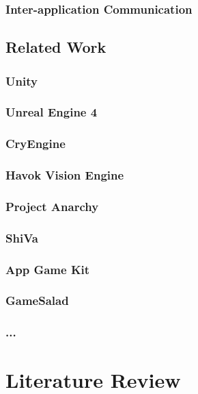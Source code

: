 \documentclass[bsc,frontabs,twoside,singlespacing,parskip,deptreport]{infthesis}     %
\begin{document}
\subsection{Inter-application Communication}

\section{Related Work}
\subsection{Unity}
\subsection{Unreal Engine 4}
\subsection{CryEngine}
\subsection{Havok Vision Engine}
\subsection{Project Anarchy}
\subsection{ShiVa}
\subsection{App Game Kit}
\subsection{GameSalad}
\subsection{...}






\chapter{Literature Review}
\end{document}
